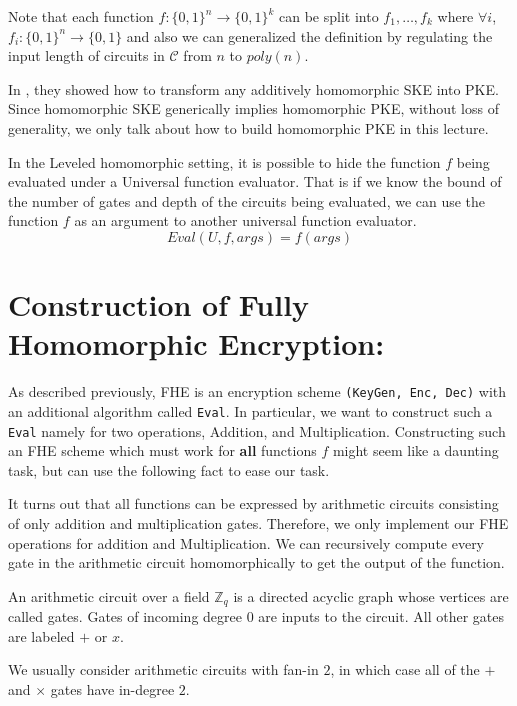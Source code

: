 \documentclass[usletter]{article}
\begin{document}
Note that each function $f:\{0,1\}^n\rightarrow\{0,1\}^k$ can be split into $f_1,\dots,f_k$ where $\forall i$, $f_i:\{0,1\}^n\rightarrow\{0,1\}$ and also we can generalized the definition by regulating the input length of circuits in $\mathcal{C}$ from $n$ to $poly(n)$.

In \cite{rothblum2011homomorphic}, they showed how to transform any additively homomorphic SKE into PKE. Since homomorphic SKE generically implies homomorphic PKE, without loss of generality, we only talk about how to build homomorphic PKE in this lecture.

\begin{remark}
    In the Leveled homomorphic setting, it is possible to hide the function $f$ being evaluated under a Universal function evaluator. That is if we know the bound of the number of gates and depth of the circuits being evaluated, we can use the function $f$ as an argument to another universal function evaluator.
    $$Eval(U, f, args) = f(args)$$
\end{remark}

\section{Construction of Fully Homomorphic Encryption:}
As described previously, FHE is an encryption scheme \texttt{(KeyGen, Enc, Dec)} 
with an additional algorithm called \texttt{Eval}. In particular, we want to construct such a \texttt{Eval} namely for two operations, Addition, and Multiplication. Constructing such an FHE scheme which must work for \textbf{all} functions $f$ might seem like a daunting task, 
but can use the following fact to ease our task.
\begin{fact}
It turns out that all functions can be expressed by arithmetic circuits consisting
of only addition and multiplication gates. Therefore, we only implement our FHE operations for addition and Multiplication. We can recursively compute every gate in the arithmetic circuit homomorphically to get the output of the function. 
\end{fact}

\begin{definition}
An arithmetic circuit over a field $\mathbb{Z}_q$ is a directed
acyclic graph whose vertices are called gates. Gates of incoming degree $0$ are inputs to
the circuit. All other gates are labeled $+$ or $x$. 
\end{definition}
We usually consider arithmetic circuits with fan-in $2$, in which case all of the $+$ and $\times$ gates have in-degree $2$.
\end{document}
